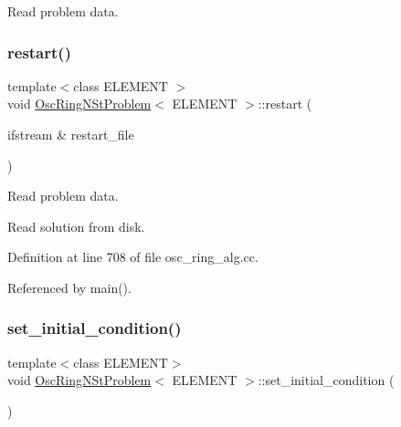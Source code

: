 Read problem data. 

\mbox{\label{classOscRingNStProblem_a0cf01737b8d53213d644413e84251d0f}} 
\subsubsection{\texorpdfstring{restart()}{restart()}\hspace{0.1cm}{\footnotesize\ttfamily [2/2]}}
{\footnotesize\ttfamily template$<$class E\+L\+E\+M\+E\+NT $>$ \\
void \hyperlink{classOscRingNStProblem}{Osc\+Ring\+N\+St\+Problem}$<$ E\+L\+E\+M\+E\+NT $>$\+::restart (\begin{DoxyParamCaption}\item[{ifstream \&}]{restart\+\_\+file }\end{DoxyParamCaption})}



Read problem data. 

Read solution from disk. 

Definition at line 708 of file osc\+\_\+ring\+\_\+alg.\+cc.



Referenced by main().

\mbox{\label{classOscRingNStProblem_ab1f2083699d00da4b7f6116e10792e86}} 
\subsubsection{\texorpdfstring{set\+\_\+initial\+\_\+condition()}{set\_initial\_condition()}\hspace{0.1cm}{\footnotesize\ttfamily [1/2]}}
{\footnotesize\ttfamily template$<$class E\+L\+E\+M\+E\+NT$>$ \\
void \hyperlink{classOscRingNStProblem}{Osc\+Ring\+N\+St\+Problem}$<$ E\+L\+E\+M\+E\+NT $>$\+::set\+\_\+initial\+\_\+condition (\begin{DoxyParamCaption}{ }\end{DoxyParamCaption})}



